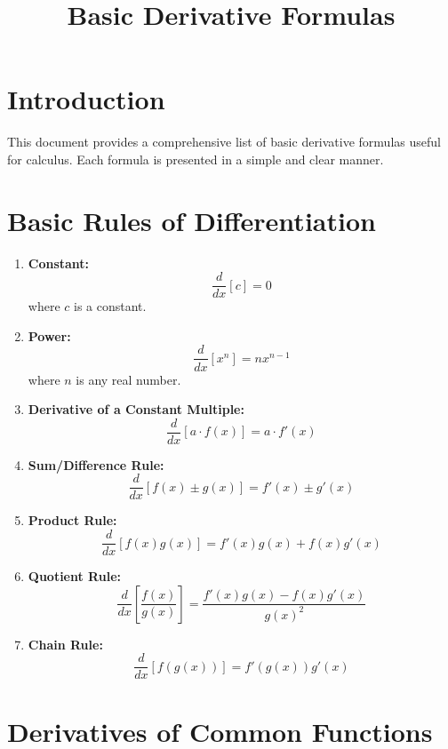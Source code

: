\documentclass[a4paper,12pt]{article}
\title{Basic Derivative Formulas}
\author{}
\date{}
\begin{document}
\maketitle

\section*{Introduction}
This document provides a comprehensive list of basic derivative formulas useful for calculus. Each formula is presented in a simple and clear manner.

\section*{Basic Rules of Differentiation}

\begin{enumerate}
    \item \textbf{Constant:} 
    \[ \frac{d}{dx}[c] = 0 \]
    where \( c \) is a constant.

    \item \textbf{Power:} 
    \[ \frac{d}{dx}[x^n] = nx^{n-1} \]
    where \( n \) is any real number.

    \item \textbf{Derivative of a Constant Multiple:}
    \[ \frac{d}{dx}[a \cdot f(x)] = a \cdot f'(x) \]

    \item \textbf{Sum/Difference Rule:} 
    \[ \frac{d}{dx}[f(x) \pm g(x)] = f'(x) \pm g'(x) \]

    \item \textbf{Product Rule:} 
    \[ \frac{d}{dx}[f(x)g(x)] = f'(x)g(x) + f(x)g'(x) \]

    \item \textbf{Quotient Rule:} 
    \[ \frac{d}{dx}\left[\frac{f(x)}{g(x)}\right] = \frac{f'(x)g(x) - f(x)g'(x)}{g(x)^2} \]

    \item \textbf{Chain Rule:} 
    \[ \frac{d}{dx}[f(g(x))] = f'(g(x))g'(x) \]
\end{enumerate}

\section*{Derivatives of Common Functions}
\end{document}
